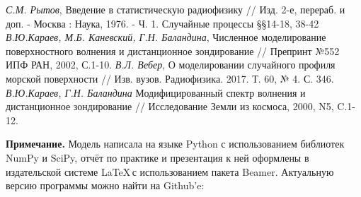 


\begin{thebibliography}{}
	 \textit{С.М. Рытов}, Введение в статистическую радиофизику // Изд. 2-е, перераб. и доп. - Москва : Наука, 1976. - Ч. 1. Случайные процессы \S\S 14-18, 38-42 
	 \textit{В.Ю.Караев, М.Б. Каневский, Г.Н. Баландина}, Численное моделирование поверхностного волнения и дистанционное зондирование // Препринт №552 ИПФ РАН, 2002, С.1-10.
	 \textit{В.Л. Вебер}, О моделировании случайного профиля морской поверхности // Изв. вузов. Радиофизика. 2017. Т. 60, № 4. С. 346.
	 \textit{В.Ю.Караев, Г.Н. Баландина} Модифицированный спектр волнения и дистанционное зондирование // Исследование Земли из космоса, 2000, N5, C.1-12.

\end{thebibliography}
\textbf{Примечание.} Модель написала на языке Python с использованием библиотек NumPy и SciPy, отчёт по практике и презентация к ней оформлены в издательской системе \LaTeX\,с использованием пакета Beamer. Актуальную версию программы можно найти на 
Github'e: 

\begin{center}
\end{center}


